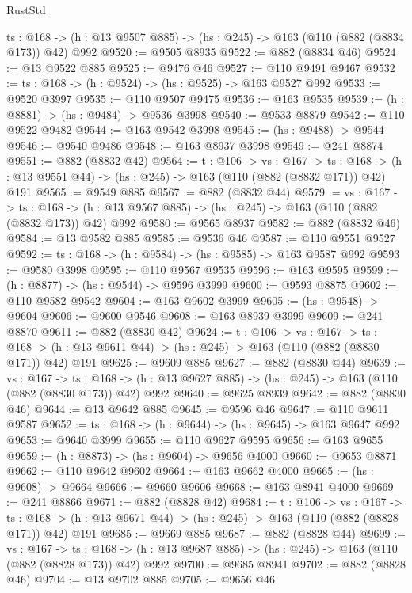 \begin{lexlean}{RustStd}
\begin{coremodule}
  {ts : @168} -> (h : @13 @9507 @885) -> (hs : @245) -> @163 (@110 (@882 (@8834 @173)) @42) @992
@9520 := @9505 @8935
@9522 := @882 (@8834 @46)
@9524 := @13 @9522 @885
@9525 := @9476 @46
@9527 := @110 @9491 @9467
@9532 := {ts : @168} -> (h : @9524) -> (hs : @9525) -> @163 @9527 @992
@9533 := @9520 @3997
@9535 := @110 @9507 @9475
@9536 := @163 @9535
@9539 := (h : @8881) -> (hs : @9484) -> @9536 @3998
@9540 := @9533 @8879
@9542 := @110 @9522 @9482
@9544 := @163 @9542 @3998
@9545 := (hs : @9488) -> @9544
@9546 := @9540 @9486
@9548 := @163 @8937 @3998
@9549 := @241 @8874
@9551 := @882 (@8832 @42)
@9564 := {t : @106} ->
  {vs : @167} ->
  {ts : @168} -> (h : @13 @9551 @44) -> (hs : @245) -> @163 (@110 (@882 (@8832 @171)) @42) @191
@9565 := @9549 @885
@9567 := @882 (@8832 @44)
@9579 := {vs : @167} ->
  {ts : @168} -> (h : @13 @9567 @885) -> (hs : @245) -> @163 (@110 (@882 (@8832 @173)) @42) @992
@9580 := @9565 @8937
@9582 := @882 (@8832 @46)
@9584 := @13 @9582 @885
@9585 := @9536 @46
@9587 := @110 @9551 @9527
@9592 := {ts : @168} -> (h : @9584) -> (hs : @9585) -> @163 @9587 @992
@9593 := @9580 @3998
@9595 := @110 @9567 @9535
@9596 := @163 @9595
@9599 := (h : @8877) -> (hs : @9544) -> @9596 @3999
@9600 := @9593 @8875
@9602 := @110 @9582 @9542
@9604 := @163 @9602 @3999
@9605 := (hs : @9548) -> @9604
@9606 := @9600 @9546
@9608 := @163 @8939 @3999
@9609 := @241 @8870
@9611 := @882 (@8830 @42)
@9624 := {t : @106} ->
  {vs : @167} ->
  {ts : @168} -> (h : @13 @9611 @44) -> (hs : @245) -> @163 (@110 (@882 (@8830 @171)) @42) @191
@9625 := @9609 @885
@9627 := @882 (@8830 @44)
@9639 := {vs : @167} ->
  {ts : @168} -> (h : @13 @9627 @885) -> (hs : @245) -> @163 (@110 (@882 (@8830 @173)) @42) @992
@9640 := @9625 @8939
@9642 := @882 (@8830 @46)
@9644 := @13 @9642 @885
@9645 := @9596 @46
@9647 := @110 @9611 @9587
@9652 := {ts : @168} -> (h : @9644) -> (hs : @9645) -> @163 @9647 @992
@9653 := @9640 @3999
@9655 := @110 @9627 @9595
@9656 := @163 @9655
@9659 := (h : @8873) -> (hs : @9604) -> @9656 @4000
@9660 := @9653 @8871
@9662 := @110 @9642 @9602
@9664 := @163 @9662 @4000
@9665 := (hs : @9608) -> @9664
@9666 := @9660 @9606
@9668 := @163 @8941 @4000
@9669 := @241 @8866
@9671 := @882 (@8828 @42)
@9684 := {t : @106} ->
  {vs : @167} ->
  {ts : @168} -> (h : @13 @9671 @44) -> (hs : @245) -> @163 (@110 (@882 (@8828 @171)) @42) @191
@9685 := @9669 @885
@9687 := @882 (@8828 @44)
@9699 := {vs : @167} ->
  {ts : @168} -> (h : @13 @9687 @885) -> (hs : @245) -> @163 (@110 (@882 (@8828 @173)) @42) @992
@9700 := @9685 @8941
@9702 := @882 (@8828 @46)
@9704 := @13 @9702 @885
@9705 := @9656 @46

\end{coremodule}
\end{lexlean}
